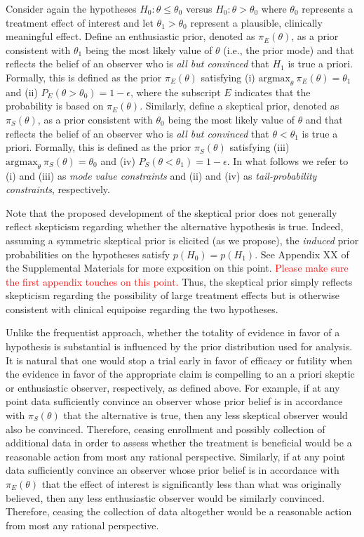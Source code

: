 \documentclass[useAMS,usenatbib,referee]{biom}
\begin{document}
Consider again the hypotheses $H_0: \theta \le \theta_0$ versus $H_0: \theta > \theta_0$ where $\theta_0$ represents a 
treatment effect of interest and let $\theta_1>\theta_0$ represent a plausible, clinically meaningful effect.
%
Define an enthusiastic prior, denoted as $\pi_{E}(\theta)$, as a prior consistent with $\theta_1$ being the most 
likely value of $\theta$ (i.e., the prior mode) and that reflects the belief of an observer who is 
\textit{all but convinced} that $H_1$ is true a priori. 
%
Formally, this is defined as the prior $\pi_E(\theta)$ satisfying (i) $\text{argmax}_\theta~\pi_E(\theta)=\theta_1$
and (ii) $P_E(\theta >\theta_0)=1-\epsilon$, where the subscript $E$ indicates that the probability is 
based on $\pi_{E}(\theta)$.
%
Similarly, define a skeptical prior, denoted as $\pi_{S}(\theta)$, as a prior consistent with $\theta_0$ being the most 
likely value of $\theta$ and that reflects the belief of an observer who is \textit{all but convinced} that 
$\theta <\theta_1$ is true a priori. 
%
Formally, this is defined as the prior $\pi_{S}(\theta)$ satisfying
(iii) $\text{argmax}_\theta~\pi_S(\theta)=\theta_0$  and (iv) $P_S(\theta <\theta_1)=1-\epsilon$.
%
In what follows we refer to (i) and (iii) as \textit{mode value constraints} and (ii) and (iv) as \textit{tail-probability constraints}, respectively.

Note that the proposed development of the skeptical prior does not generally reflect skepticism regarding whether the alternative hypothesis is true. 
%
Indeed, assuming a symmetric skeptical prior is elicited (as we propose), the \textit{induced} prior probabilities on the hypotheses
satisfy $p(H_0) =  p(H_1)$.
%
See Appendix XX of the Supplemental Materials for more exposition on this point.
%
\textcolor{red}{Please make sure the first appendix touches on this point.}
%
Thus, the skeptical prior simply reflects skepticism regarding the possibility of large treatment effects but is
otherwise consistent with clinical equipoise regarding the two hypotheses.
%

Unlike the frequentist approach, whether the totality of evidence in favor of a hypothesis is substantial is influenced by 
the prior distribution used for analysis.
%
It is natural that one would stop a trial early in favor of efficacy or futility when the evidence in favor of the appropriate claim is compelling
to an a priori skeptic or enthusiastic observer, respectively, as defined above.
%
For example, if at any point data sufficiently convince an observer whose prior belief is in accordance with $\pi_{S}(\theta)$ that 
the alternative is true, then any less skeptical observer would also be convinced. Therefore, ceasing enrollment and possibly collection 
of additional data in order to assess whether the treatment is beneficial would be a reasonable action from most any rational perspective.
%
Similarly, if at any point data sufficiently convince an observer whose prior belief is in accordance with $\pi_{E}(\theta)$ that 
the effect of interest is significantly less than what was originally believed, then any less enthusiastic observer would be similarly convinced.
Therefore, ceasing the collection of data altogether would be a reasonable action from most any rational perspective.
\end{document}
